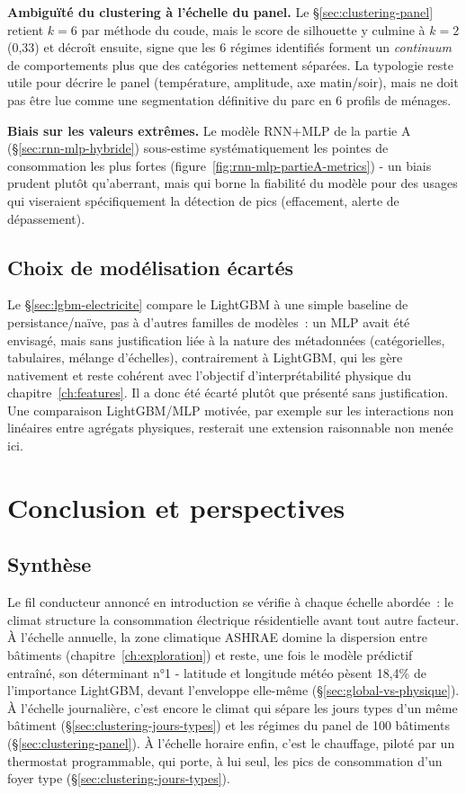 \textbf{Ambiguïté du clustering à l'échelle du panel.} Le \S\ref{sec:clustering-panel} retient
$k=6$ par méthode du coude, mais le score de silhouette y culmine à $k=2$ (0,33) et décroît
ensuite, signe que les 6 régimes identifiés forment un \emph{continuum} de comportements plus
que des catégories nettement séparées. La typologie reste utile pour décrire le panel
(température, amplitude, axe matin/soir), mais ne doit pas être lue comme une segmentation
définitive du parc en 6 profils de ménages.

\textbf{Biais sur les valeurs extrêmes.} Le modèle RNN+MLP de la partie A
(\S\ref{sec:rnn-mlp-hybride}) sous-estime systématiquement les pointes de consommation les plus
fortes (figure~\ref{fig:rnn-mlp-partieA-metrics}) - un biais prudent plutôt qu'aberrant, mais qui
borne la fiabilité du modèle pour des usages qui viseraient spécifiquement la détection de pics
(effacement, alerte de dépassement).

\section{Choix de modélisation écartés}
\label{sec:choix-ecartes}
Le \S\ref{sec:lgbm-electricite} compare le LightGBM à une simple baseline de persistance/naïve,
pas à d'autres familles de modèles~: un MLP avait été envisagé, mais sans justification liée à la
nature des métadonnées (catégorielles, tabulaires, mélange d'échelles), contrairement à LightGBM,
qui les gère nativement et reste cohérent avec l'objectif d'interprétabilité physique du
chapitre~\ref{ch:features}. Il a donc été écarté plutôt que présenté sans justification. Une
comparaison LightGBM/MLP motivée, par exemple sur les interactions non linéaires entre agrégats
physiques, resterait une extension raisonnable non menée ici.

\chapter{Conclusion et perspectives}
\label{ch:conclusion}

\section{Synthèse}
\label{sec:synthese}
Le fil conducteur annoncé en introduction se vérifie à chaque échelle abordée~: le climat
structure la consommation électrique résidentielle avant tout autre facteur. À l'échelle
annuelle, la zone climatique ASHRAE domine la dispersion entre bâtiments
(chapitre~\ref{ch:exploration}) et reste, une fois le modèle prédictif entraîné, son déterminant
n°1 - latitude et longitude météo pèsent 18,4\% de l'importance LightGBM, devant l'enveloppe
elle-même (\S\ref{sec:global-vs-physique}). À l'échelle journalière, c'est encore le climat qui
sépare les jours types d'un même bâtiment (\S\ref{sec:clustering-jours-types}) et les régimes du
panel de 100 bâtiments (\S\ref{sec:clustering-panel}). À l'échelle horaire enfin, c'est le
chauffage, piloté par un thermostat programmable, qui porte, à lui seul, les pics de
consommation d'un foyer type (\S\ref{sec:clustering-jours-types}).

